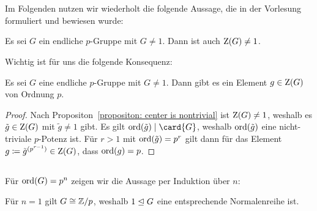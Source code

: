 \section{}

Im Folgenden nutzen wir wiederholt die folgende Aussage, die in der Vorlesung formuliert und bewiesen wurde:

\begin{proposition}
  \label{propositon: center is nontrivial}
  Es sei $G$ ein endliche $p$-Gruppe mit $G \neq 1$.
  Dann ist auch $\operatorname{Z}(G) \neq 1$.
\end{proposition}

Wichtig ist für uns die folgende Konsequenz:

\begin{corollary}
  \label{corollary: center contains an element of order p}
  Es sei $G$ eine endliche $p$-Gruppe mit $G \neq 1$.
  Dann gibt es ein Element $g \in \operatorname{Z}(G)$ von Ordnung $p$.
\end{corollary}

\begin{proof}
  Nach Propositon~\ref{propositon: center is nontrivial} ist $\operatorname{Z}(G) \neq 1$, weshalb es $\tilde{g} \in \operatorname{Z}(G)$ mit $\tilde{g} \neq 1$ gibt.
  Es gilt $\ord{\tilde{g}} \divides \card{G}$, weshalb $\operatorname{ord}(\tilde{g})$ eine nicht-triviale $p$-Potenz ist.
  Für $r > 1$ mit $\operatorname{ord}(\tilde{g}) = p^r$ gilt dann für das Element $g \coloneqq \tilde{g}^{(p^{r-1})} \in \operatorname{Z}(G)$, dass $\operatorname{ord}(g) = p$.
\end{proof}





\subsection{}

Für $\operatorname{ord}(G) = p^n$ zeigen wir die Aussage per Induktion über $n$:

Für $n = 1$ gilt $G \cong \mathbb{Z}/p$, weshalb $1 \trianglelefteq G$ eine entsprechende Normalenreihe ist.

